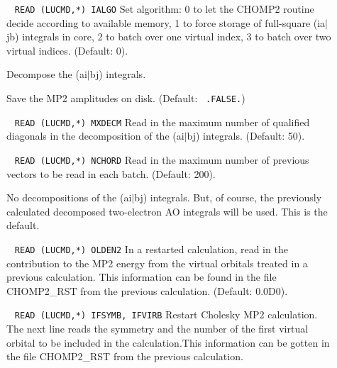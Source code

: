 \begin{description}
\item[]\verb| |\newline
\verb|READ (LUCMD,*) IALGO|\newline
        Set algorithm: 0 to let the CHOMP2 routine decide according
        to available memory,
        1 to force storage of full-square (ia$\mid$jb) integrals 
        in core, 2 to batch over one virtual index, 3 to batch
        over two virtual indices. (Default: 0).
%
\item[] 
        Decompose the (ai$\mid$bj) integrals. 
%
\item[] 
        Save the MP2 amplitudes on disk. (Default: 
        \verb| .FALSE.|)
%
\item[] \verb| |\newline
\verb|READ (LUCMD,*) MXDECM|\newline
        Read in the maximum number of qualified diagonals in
        the decomposition of the (ai$\mid$bj) integrals. (Default: 50).
%
\item[] \verb| |\newline
\verb|READ (LUCMD,*) NCHORD|\newline
        Read in the maximum number of previous vectors
        to be read in each batch. (Default: 200).
%
\item[] 
        No decompositions of the (ai$\mid$bj) integrals. But, of course,
        the previously calculated decomposed two-electron AO integrals
        will be used. This is the default.
%
\item[] \verb| |\newline
\verb|READ (LUCMD,*) OLDEN2|\newline
        In a restarted calculation, read in the contribution
        to the MP2 energy from the virtual orbitals treated in
        a previous calculation. This information can be found in
        the file CHOMP2\_RST from the previous 
        calculation. (Default: 0.0D0).
%
\item[] \verb| |\newline
\verb|READ (LUCMD,*) IFSYMB, IFVIRB|\newline
        Restart Cholesky MP2 calculation. The next line reads
        the symmetry and the number of the first virtual orbital 
        to be included in the calculation.This information can 
        be gotten in the file CHOMP2\_RST from the previous 
        calculation. 

\end{description}

